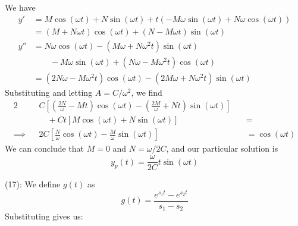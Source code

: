 \documentclass[a4paper]{article}
\begin{document}

We have 
\begin{align*}
	y' & = M \cos\!\left(\omega t \right) + N \sin\!\left(\omega t \right) + t \!\left( -M \omega \sin\!\left(\omega t \right) + N \omega \cos\!\left(\omega t \right)  \right) \\
	   & = \!\left( M + N \omega t  \right) \cos\!\left(\omega t \right) + \!\left( N - M \omega t  \right) \sin\!\left(\omega t \right) \\
       y'' & = N \omega \cos\!\left( \omega t \right) - \!\left( M \omega + N \omega^{2} t  \right) \sin\!\left(\omega t \right) \\
	   & \qquad - M \omega \sin\!\left( \omega t \right) + \!\left( N \omega - M \omega^{2} t  \right) \cos\!\left(\omega t \right) \\
	   & = \!\left( 2N \omega - M \omega^{2} t  \right) \cos\!\left(\omega t \right) - \!\left( 2M \omega + N \omega^{2} t  \right) \sin\!\left(\omega t \right) 
\end{align*}
Substituting and letting \( A = C / \omega^{2} \), we find
\begin{alignat*}{2}
	&& C \!\left[ \!\left( \frac{2N}{\omega } - Mt  \right)\cos\!\left(\omega t \right) - \!\left( \frac{2M}{\omega } + Nt  \right)\sin\!\left(\omega t \right)  \right] \quad &  \\
	&& \quad + Ct \!\left[ M \cos\!\left(\omega t \right) + N \sin\!\left(\omega t \right)  \right] & =  \\ 
	\implies && 2C \!\left[ \frac{N }{\omega } \cos\!\left(\omega t \right) - \frac{M }{\omega }\sin\!\left(\omega t \right)  \right] & = \cos\!\left(\omega t \right) 
\end{alignat*}
We can conclude that \( M = 0 \) and \( N = \omega / 2C \), and our particular solution is
\[
	y_{p } \!\left( t  \right) = \frac{\omega}{2C} t \sin\!\left(\omega t \right)  
\]


(17): We define \( g \!\left( t  \right) \) as 
\[
	g \!\left( t  \right) = \frac{e^{s_{1}t } - e^{s_{2}t }}{s_{1} - s_{2}} 
\]
Substituting gives us:
\end{document}
